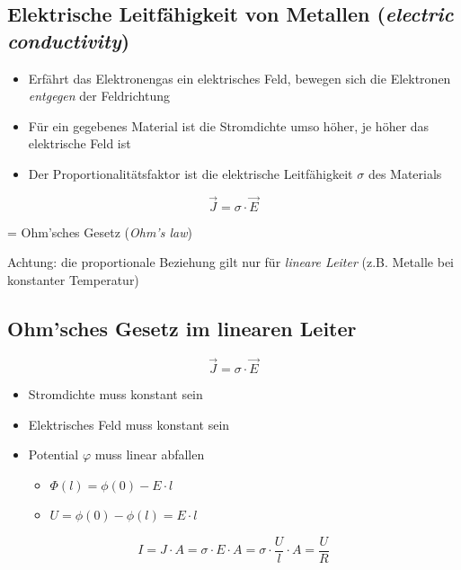 \documentclass[
  11pt,
]{article}
\providecommand{\tightlist}{%
  \setlength{\itemsep}{0pt}\setlength{\parskip}{0pt}}
\begin{document}
\subsection{\texorpdfstring{Elektrische Leitfähigkeit von Metallen
(\emph{electric
conductivity})}{Elektrische Leitfähigkeit von Metallen (electric conductivity)}}\label{elektrische-leitfuxe4higkeit-von-metallen-electric-conductivity}

\begin{itemize}
\tightlist
\item
  Erfährt das Elektronengas ein elektrisches Feld, bewegen sich die
  Elektronen \emph{entgegen} der Feldrichtung
\item
  Für ein gegebenes Material ist die Stromdichte umso höher, je höher
  das elektrische Feld ist
\item
  Der Proportionalitätsfaktor ist die elektrische Leitfähigkeit
  \(\sigma\) des Materials
\end{itemize}

\[\vec{J} = \sigma \cdot \vec{E}\]

= Ohm'sches Gesetz (\emph{Ohm's law})

Achtung: die proportionale Beziehung gilt nur für \emph{lineare Leiter}
(z.B. Metalle bei konstanter Temperatur)

\subsection{Ohm'sches Gesetz im linearen
Leiter}\label{ohmsches-gesetz-im-linearen-leiter}

\[\vec{J} = \sigma \cdot \vec{E}\]

\begin{itemize}
\tightlist
\item
  Stromdichte muss konstant sein
\item
  Elektrisches Feld muss konstant sein
\item
  Potential \(\varphi\) muss linear abfallen

  \begin{itemize}
  \tightlist
  \item
    \(\Phi(l) = \phi(0) - E \cdot l\)
  \item
    \(U = \phi(0) - \phi(l) = E \cdot l\)
  \end{itemize}
\end{itemize}

\[I = J \cdot A = \sigma \cdot E \cdot A = \sigma \cdot \frac{U}{l} \cdot A = \frac{U}{R}\]
\end{document}
